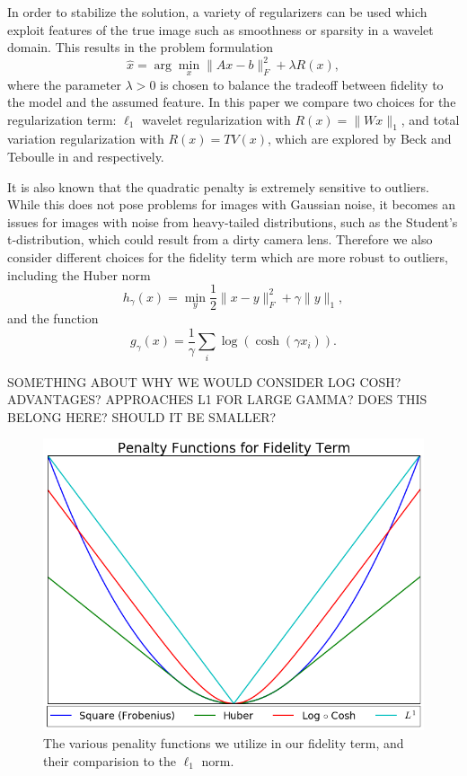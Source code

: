 \documentclass[10pt,a4paper]{article}
\begin{document}
	In order to stabilize the solution, a variety of regularizers can be used which exploit features of the true image such as smoothness or sparsity in a wavelet domain. This results in the problem formulation
	\begin{equation}
	\hat{x} = \arg\min_{x} \| Ax - b \|_F^2 + \lambda R(x),
	\end{equation}
	where the parameter $\lambda > 0$ is chosen to balance the tradeoff between fidelity to the model and the assumed feature. In this paper we compare two choices for the regularization term: $\ell_1$ wavelet regularization with $R(x) = \| Wx \|_1$, and total variation regularization with $R(x) = TV(x)$, which are explored by Beck and Teboulle in \cite{TV} and \cite{FISTA} respectively.
	
	It is also known that the quadratic penalty is extremely sensitive to outliers. While this does not pose problems for images with Gaussian noise, it becomes an issues for images with noise from heavy-tailed distributions, such as the Student's t-distribution, which could result from a dirty camera lens. Therefore we also consider different choices for the fidelity term which are more robust to outliers, including the Huber norm
	\begin{equation} \label{huber}
	h_{\gamma}(x) = \min_y \frac{1}{2} \| x - y \|_F^2 + \gamma \| y \|_1,
	\end{equation}
	and the function
	\begin{equation} \label{log_cosh}
	g_{\gamma}(x) = \frac{1}{\gamma} \sum_i \log\left(\cosh\left(\gamma x_i\right)\right).
	\end{equation}
	
	SOMETHING ABOUT WHY WE WOULD CONSIDER LOG COSH? ADVANTAGES? APPROACHES L1 FOR LARGE GAMMA? DOES THIS BELONG HERE? SHOULD IT BE SMALLER?
	
	\begin{figure}[H]
		\centering
		\includegraphics[scale=.35]{../figures/penalty_functions.png} 
		\caption{The various penality functions we utilize in our fidelity term, and their comparision to the $\ell_1$ norm.}
	\end{figure}
	
\end{document}
